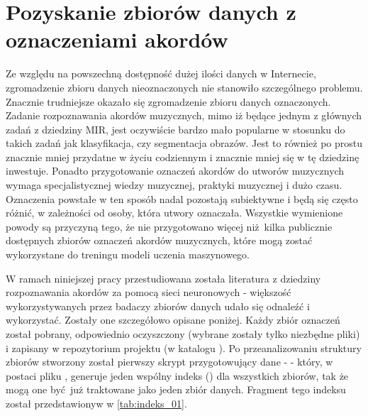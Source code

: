 \section{Pozyskanie zbiorów danych z oznaczeniami akordów}

Ze względu na powszechną dostępność dużej ilości danych w Internecie, zgromadzenie zbioru danych
nieoznaczonych nie stanowiło szczególnego problemu. Znacznie trudniejsze okazało się zgromadzenie
zbioru danych oznaczonych. Zadanie rozpoznawania akordów muzycznych, mimo iż będące jednym z
głównych zadań z dziedziny MIR, jest oczywiście bardzo mało popularne w stosunku do takich
zadań jak klasyfikacja, czy segmentacja obrazów. Jest to również po prostu znacznie mniej przydatne
w życiu codziennym i znacznie mniej się w tę dziedzinę inwestuje. Ponadto przygotowanie oznaczeń
akordów do utworów muzycznych wymaga specjalistycznej wiedzy muzycznej, praktyki muzycznej i dużo
czasu. Oznaczenia powstałe w ten sposób nadal pozostają subiektywne i będą się często różnić, w
zależności od osoby, która utwory oznaczała. Wszystkie wymienione powody są przyczyną tego, że nie
przygotowano więcej niż kilka publicznie dostępnych zbiorów oznaczeń akordów muzycznych, które mogą
zostać wykorzystane do treningu modeli uczenia maszynowego.

W ramach niniejszej pracy przestudiowana została literatura z dziedziny rozpoznawania akordów za
pomocą sieci neuronowych - większość wykorzystywanych przez badaczy zbiorów danych udało się
odnaleźć i wykorzystać. Zostały one szczegółowo opisane poniżej. Każdy zbiór oznaczeń został
pobrany, odpowiednio oczyszczony (wybrane zostały tylko niezbędne pliki) i zapisany w repozytorium
projektu (w katalogu ). Po przeanalizowaniu struktury zbiorów stworzony został
pierwszy skrypt przygotowujący dane -  -
który, w postaci pliku , generuje jeden wspólny indeks () dla wszystkich
zbiorów, tak że mogą one być już traktowane jako jeden zbiór danych. Fragment tego indeksu został
przedstawionyw w \ref{tab:indeks_01}.

